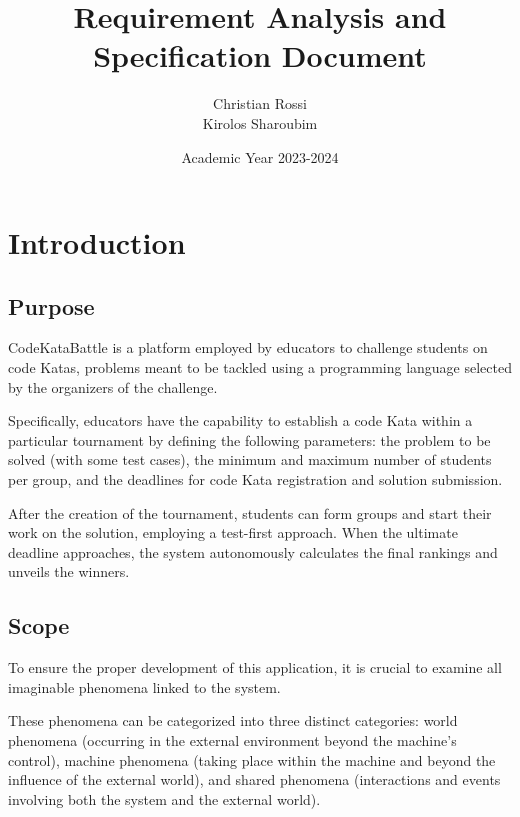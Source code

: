 \documentclass[12pt, a4paper]{report}
\title{Requirement Analysis and Specification Document}
\author{Christian Rossi \\ Kirolos Sharoubim}
\date{Academic Year 2023-2024}
\begin{document}
\maketitle

\newpage

\tableofcontents

\newpage

\chapter{Introduction}
    \section{Purpose}
    CodeKataBattle is a platform employed by educators to challenge students on code Katas, problems meant to be tackled using a programming language selected by 
    the organizers of the challenge.
    
    Specifically, educators have the capability to establish a code Kata within a particular tournament by defining the following parameters: the problem to be solved 
    (with some test cases), the minimum and maximum number of students per group, and the deadlines for code Kata registration and solution submission.
    
    After the creation of the tournament, students can form groups and start their work on the solution, employing a test-first approach. When the ultimate deadline 
    approaches, the system autonomously calculates the final rankings and unveils the winners.

    \section{Scope}
    To ensure the proper development of this application, it is crucial to examine all imaginable phenomena linked to the system.
    
    These phenomena can be categorized into three distinct categories: world phenomena (occurring in the external environment beyond the machine's control), machine 
    phenomena (taking place within the machine and beyond the influence of the external world), and shared phenomena (interactions and events involving both the system
    and the external world).
\end{document}

